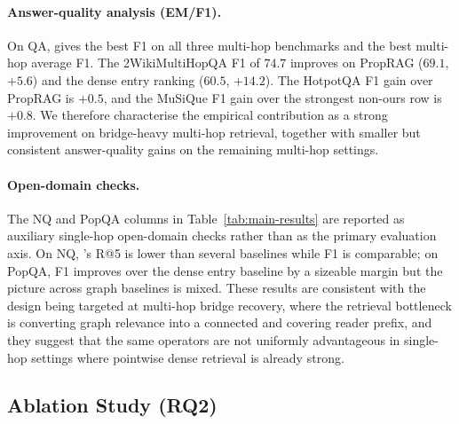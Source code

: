 \paragraph{Answer-quality analysis (EM/F1).}
On QA, \methodname{} gives the best F1 on all three multi-hop
benchmarks and the best multi-hop average F1. The
2WikiMultiHopQA F1 of $74.7$ improves on PropRAG ($69.1$, $+5.6$)
and the dense entry ranking ($60.5$, $+14.2$). The HotpotQA F1 gain
over PropRAG is $+0.5$, and the MuSiQue F1 gain over the strongest
non-ours row is $+0.8$. We therefore characterise the empirical
contribution as a strong improvement on bridge-heavy multi-hop
retrieval, together with smaller but consistent answer-quality gains
on the remaining multi-hop settings.

\paragraph{Open-domain checks.}
The NQ and PopQA columns in Table~\ref{tab:main-results} are
reported as auxiliary single-hop open-domain checks rather than as
the primary evaluation axis. On NQ, \methodname{}'s R@5 is lower
than several baselines while F1 is comparable; on PopQA, F1
improves over the dense entry baseline by a sizeable margin but
the picture across graph baselines is mixed. These results are
consistent with the design being targeted at multi-hop bridge
recovery, where the retrieval bottleneck is converting graph
relevance into a connected and covering reader prefix, and they
suggest that the same operators are not uniformly advantageous in
single-hop settings where pointwise dense retrieval is already
strong.

\subsection{Ablation Study (RQ2)}
\label{sec:experiments:ablation}

